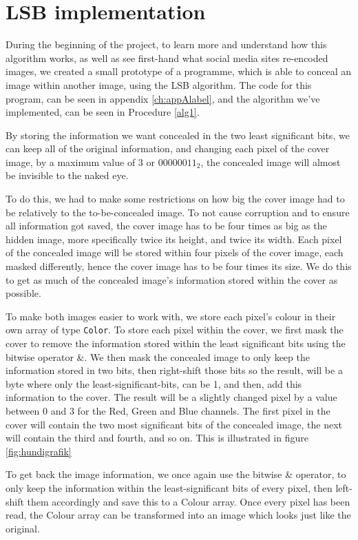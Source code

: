 \section{LSB implementation}
\label{sec:lsb-implementation}
During the beginning of the project, to learn more and understand how this algorithm works, as well as see first-hand what social media sites re-encoded images, we created a small prototype of a programme, which is able to conceal an image within another image, using the LSB algorithm. The code for this program, can be seen in appendix \ref{ch:appAlabel}, and the algorithm we've implemented, can be seen in Procedure \ref{alg1}.

By storing the information we want concealed in the two least significant bits, we can keep all of the original information, and changing each pixel of the cover image, by a maximum value of 3 or $00000011_2$, the concealed image will almost be invisible to the naked eye.

To do this, we had to make some restrictions on how big the cover image had to be relatively to the to-be-concealed image. 
To not cause corruption and to ensure all information got saved, the cover image has to be four times as big as the hidden image, more specifically twice its height, and twice its width. 
Each pixel of the concealed image will be stored within four pixels of the cover image, each masked differently, hence the cover image has to be four times its size. 
We do this to get as much of the concealed image's information stored within the cover as possible.

To make both images easier to work with, we store each pixel's colour in their own array of type \lstinline|Color|.
To store each pixel within the cover, we first mask the cover to remove the information stored within the least significant bits using the bitwise operator \&. 
We then mask the concealed image to only keep the information stored in two bits, then right-shift those bits so the result, will be a byte where only the least-significant-bits, can be 1, and then, add this information to the cover. 
The result will be a slightly changed pixel by a value between 0 and 3 for the Red, Green and Blue channels. 
The first pixel in the cover will contain the two most significant bits of the concealed image, the next will contain the third and fourth, and so on. This is illustrated in figure \ref{fig:hundigrafik}

To get back the image information, we once again use the bitwise \& operator, to only keep the information within the least-significant bits of every pixel, then left-shift them accordingly and save this to a Colour array. Once every pixel has been read, the Colour array can be transformed into an image which looks just like the original.

